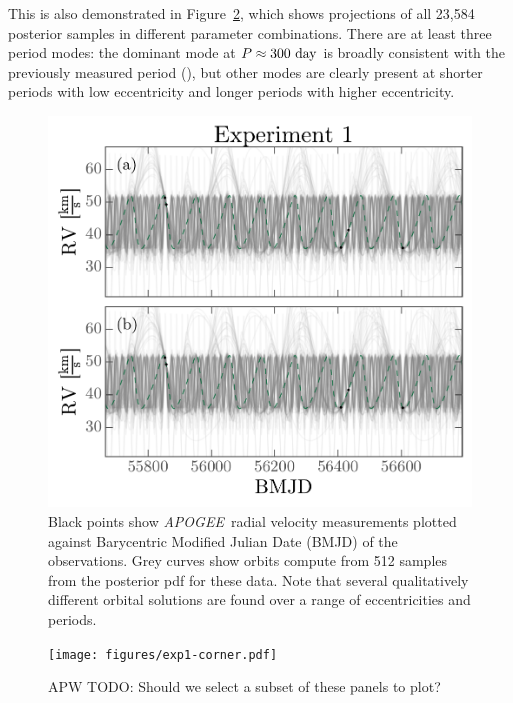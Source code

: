 \documentclass[manuscript, letterpaper]{aastex6}
\newcommand{\project}[1]{\textsl{#1}}
\newcommand{\acronym}[1]{{\small{#1}}}
\newcommand{\apogee}{\project{\acronym{APOGEE}}}
\newcommand{\todoapw}[1]{{\color{red}APW TODO: #1}}
\begin{document}
This is also demonstrated in Figure~\ref{fig:exp1-corner}, which shows
projections of all 23,584 posterior samples in different parameter
combinations.
There are at least three period modes: the dominant mode at $P \approx 300~{\rm
day}$ is broadly consistent with the previously measured period
(\citealt{Troup:2016}), but other modes are clearly present at shorter periods
with low eccentricity and longer periods with higher eccentricity.

\begin{figure}[p]
\begin{center}
\includegraphics[width=\textwidth]{figures/exp1-rv-curves.pdf}
\end{center}
\caption{%
Black points show \apogee\ radial velocity measurements plotted against
Barycentric Modified Julian Date (BMJD) of the observations.
Grey curves show orbits compute from 512 samples from the posterior pdf for
these data.
Note that several qualitatively different orbital solutions are found over a
range of eccentricities and periods.
\label{fig:exp1-rv}}
\end{figure}

\begin{figure}[p]
\begin{center}
\texttt{[image: figures/exp1-corner.pdf]}
\end{center}
\caption{%
\todoapw{Should we select a subset of these panels to plot?}
\label{fig:exp1-corner}}
\end{figure}
\end{document}
